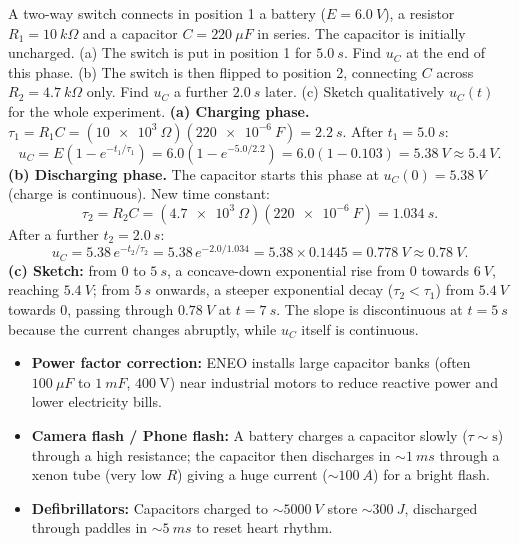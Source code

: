 \documentclass[11pt]{article}
\begin{document}
\begin{exoresolu}
A two-way switch connects in position 1 a battery ($E = \SI{6.0}{V}$), a resistor $R_1 = \SI{10}{k\Omega}$ and a capacitor $C = \SI{220}{\mu F}$ in series. The capacitor is initially uncharged. (a) The switch is put in position 1 for $\SI{5.0}{s}$. Find $u_C$ at the end of this phase. (b) The switch is then flipped to position 2, connecting $C$ across $R_2 = \SI{4.7}{k\Omega}$ only. Find $u_C$ a further $\SI{2.0}{s}$ later. (c) Sketch qualitatively $u_C(t)$ for the whole experiment.
\tcblower
\textbf{(a) Charging phase.} $\tau_1 = R_1 C = (\SI{10e3}{\Omega})(\SI{220e-6}{F}) = \SI{2.2}{s}$.
After $t_1 = \SI{5.0}{s}$:
\[ u_C = E\left(1 - e^{-t_1/\tau_1}\right) = 6.0\left(1 - e^{-5.0/2.2}\right) = 6.0(1 - 0.103) = \SI{5.38}{V} \approx \SI{5.4}{V}. \]
\textbf{(b) Discharging phase.} The capacitor starts this phase at $u_C(0) = \SI{5.38}{V}$ (charge is continuous). New time constant:
\[ \tau_2 = R_2 C = (\SI{4.7e3}{\Omega})(\SI{220e-6}{F}) = \SI{1.034}{s}. \]
After a further $t_2 = \SI{2.0}{s}$:
\[ u_C = 5.38\,e^{-t_2/\tau_2} = 5.38\,e^{-2.0/1.034} = 5.38 \times 0.1445 = \SI{0.778}{V} \approx \SI{0.78}{V}. \]
\textbf{(c) Sketch:} from $0$ to $\SI{5}{s}$, a concave-down exponential rise from $0$ towards $\SI{6}{V}$, reaching $\SI{5.4}{V}$; from $\SI{5}{s}$ onwards, a steeper exponential decay ($\tau_2 < \tau_1$) from $\SI{5.4}{V}$ towards $0$, passing through $\SI{0.78}{V}$ at $t = \SI{7}{s}$. The slope is discontinuous at $t = \SI{5}{s}$ because the current changes abruptly, while $u_C$ itself is continuous.
\end{exoresolu}

\begin{savaistu}
\begin{itemize}
\item \textbf{Power factor correction:} ENEO installs large capacitor banks (often $\SI{100}{\mu F}$ to $\SI{1}{mF}$, $400\ \mathrm{V}$) near industrial motors to reduce reactive power and lower electricity bills.
\item \textbf{Camera flash / Phone flash:} A battery charges a capacitor slowly ($\tau \sim \mathrm{s}$) through a high resistance; the capacitor then discharges in $\sim \SI{1}{ms}$ through a xenon tube (very low $R$) giving a huge current ($\sim \SI{100}{A}$) for a bright flash.
\item \textbf{Defibrillators:} Capacitors charged to $\sim \SI{5000}{V}$ store $\sim \SI{300}{J}$, discharged through paddles in $\sim \SI{5}{ms}$ to reset heart rhythm.
\end{itemize}
\end{savaistu}
\end{document}
